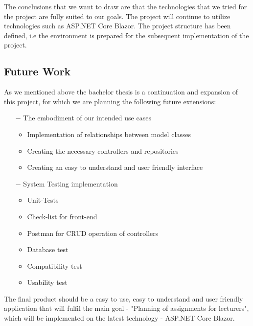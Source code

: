 \documentclass{scrartcl}
\begin{document}
    
    The conclusions that we want to draw are that the technologies that we tried for the project are fully suited to our goals. 
    	The project will continue to utilize technologies such as ASP.NET Core Blazor.
    	The project structure has been defined, i.e the environment is prepared for the subsequent implementation of the project.
    	\subsection{Future Work		}
    	As we mentioned above the bachelor thesis is a continuation and expansion of this project, for which  we are planning the following future extensions:
    \begin{itemize}
    \item [$-$]The embodiment of our intended use cases
    		\begin{itemize}
   		 \item  Implementation of relationships between model classes
  		  \item Creating the necessary controllers and repositories
   			 \item Creating an easy to understand and user friendly interface
  		  \
    \end{itemize}
	
	\item [$-$]  System Testing implementation 
			\begin{itemize}
			\item Unit-Tests
			\item Check-list for front-end
			\item Postman for CRUD operation of controllers
			\item Database test
			\item Compatibility test
			\item Usability test
			
		\end{itemize}
  
\end{itemize}	
    	The final product should be a easy to use, easy to understand and user friendly application that will fulfil the main goal - "Planning of assignments for lecturers", which will be implemented on the latest technology - ASP.NET Core Blazor.
%  
\end{document}
